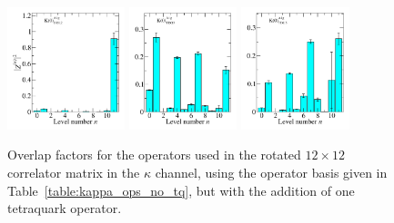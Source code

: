 \begin{figure}
  \includegraphics[width=0.304\textwidth]{figures/spectrum_a1g/with_tq/zfactors/zfactor_kaon-P000-A1g_1-DDL_2.pdf}
  \includegraphics[width=0.28\textwidth]{figures/spectrum_a1g/with_tq/zfactors/zfactor_kaon-P000-A1g_1-TDO_3.pdf}
  \includegraphics[width=0.28\textwidth]{figures/spectrum_a1g/with_tq/zfactors/zfactor_kaon-P000-A1g_1-TDU_5.pdf}
  \caption{Overlap factors for the operators used in the rotated $12\times 12$ correlator matrix in the $\kappa$ channel, using the operator basis given in Table~\ref{table:kappa_ops_no_tq}, but with the addition of one tetraquark operator.}
  \label{fig:kappa_with_tq_zfactors}
\end{figure}

